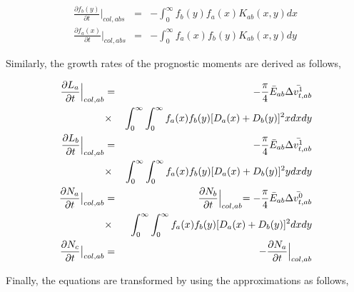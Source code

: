 \begin{eqnarray}
\frac{\partial f_{b}(y)}{\partial t}\Bigr|_{col,abs}&=&-\int_{0}^{\infty}f_{b}(y)f_{a}(x)K_{ab}(x,y)dx\label{sn189}\\
\frac{\partial f_{a}(x)}{\partial t}\Bigr|_{col,abs}&=&-\int_{0}^{\infty}f_{a}(x)f_{b}(y)K_{ab}(x,y)dy\label{sn190}
\end{eqnarray}

Similarly, the growth rates of the prognostic moments are derived as follows,

\begin{eqnarray}
\frac{\partial L_{a}}{\partial t}\Bigr|_{col,ab}&=&-\frac{\pi}{4}\bar{E}_{ab}\bar{\Delta v_{t,ab}^{1}}\nonumber\\
&\times& \int_{0}^{\infty}\int_{0}^{\infty}f_{a}(x)f_{b}(y)[D_{a}(x)+D_{b}(y)]^{2}xdxdy\label{sn191}\\
\frac{\partial L_{b}}{\partial t}\Bigr|_{col,ab}&=&-\frac{\pi}{4}\bar{E}_{ab}\bar{\Delta v_{t,ab}^{1}}\nonumber\\
&\times&\int_{0}^{\infty}\int_{0}^{\infty}f_{a}(x)f_{b}(y)[D_{a}(x)+D_{b}(y)]^{2}ydxdy\label{sn192}\\
\frac{\partial N_{a}}{\partial t}\bigr|_{col,ab}&=&\frac{\partial N_{b}}{\partial t}\Bigl|_{col,ab}=-\frac{\pi}{4}\bar{E}_{ab}\bar{\Delta v_{t,ab}^{0}}\nonumber\\
&\times&\int_{0}^{\infty}\int_{0}^{\infty}f_{a}(x)f_{b}(y)[D_{a}(x)+D_{b}(y)]^{2}dxdy\label{sn193}\\
\frac{\partial N_{c}}{\partial t}\bigr|_{col,ab}&=&-\frac{\partial N_{a}}{\partial t}\Bigl|_{col,ab}\label{sn194}
\end{eqnarray}

Finally, the equations are transformed by using the approximations as follows,


